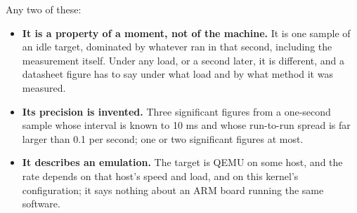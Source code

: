  Any two of these:
\begin{itemize}
  \item \textbf{It is a property of a moment, not of the machine.} It is one sample of an idle
    target, dominated by whatever ran in that second, including the measurement itself. Under any
    load, or a second later, it is different, and a datasheet figure has to say under what load and
    by what method it was measured.
  \item \textbf{Its precision is invented.} Three significant figures from a one-second sample whose
    interval is known to 10 ms and whose run-to-run spread is far larger than 0.1 per second; one or
    two significant figures at most.
  \item \textbf{It describes an emulation.} The target is QEMU on some host, and the rate depends
    on that host's speed and load, and on this kernel's configuration; it says nothing about an ARM
    board running the same software.
\end{itemize}
